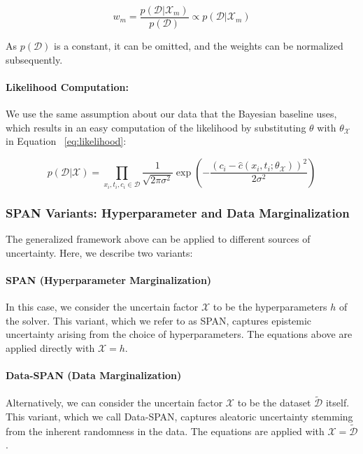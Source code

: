 \begin{equation*}
w_m = \frac{p(\mathcal{D} | \mathcal{X}_m)}{p(\mathcal{D})} \propto p(\mathcal{D} | \mathcal{X}_m)
\end{equation*}

As $p(\mathcal{D})$ is a constant, it can be omitted, and the weights can be normalized subsequently.


\paragraph{Likelihood Computation:}

We use the same assumption about our data that the Bayesian baseline uses, which results in an easy computation of the likelihood by substituting $\theta$ with $\theta_{\mathcal{X}}$ in Equation ~\vref{eq:likelihood}:

\begin{equation*}
p(\mathcal{D} | \mathcal{X}) = \prod_{x_i, t_i, c_i \in \mathcal{D}} \frac{1}{\sqrt{2\pi \sigma^2}} \exp \left( -\frac{(c_i - \hat{c}(x_i, t_i; \theta_{\mathcal{X}}))^2}{2\sigma^2} \right)
\end{equation*}

\subsubsection{SPAN Variants: Hyperparameter and Data Marginalization}

The generalized framework above can be applied to different sources of uncertainty. Here, we describe two variants:

\paragraph{SPAN (Hyperparameter Marginalization)}

In this case, we consider the uncertain factor $\mathcal{X}$ to be the hyperparameters $h$ of the solver. This variant, which we refer to as SPAN, captures epistemic uncertainty arising from the choice of hyperparameters. The equations above are applied directly with $\mathcal{X} = h$.

\paragraph{Data-SPAN (Data Marginalization)}

Alternatively, we can consider the uncertain factor $\mathcal{X}$ to be the dataset $\tilde{\mathcal{D}}$ itself. This variant, which we call Data-SPAN, captures aleatoric uncertainty stemming from the inherent randomness in the data. The equations are applied with $\mathcal{X} = \tilde{\mathcal{D}}$.

